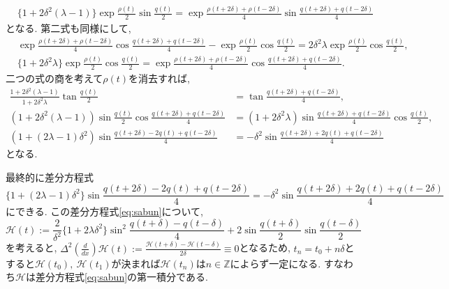 \documentclass[a4paper]{ujarticle}
\numberwithin{equation}{section}
\theoremstyle{definition}
\begin{document}
\begin{enumerate}
\begin{align}
            &\{1 + 2 \delta^2 (\lambda - 1) \} \exp \frac{\rho(t)}{2} \sin{\frac{q(t)}{2}} 
            = \exp \frac{\rho(t + 2 \delta) + \rho(t - 2 \delta)}{4} \sin{\frac{q(t + 2 \delta) + q(t - 2 \delta)}{4}}
        \end{align}
        となる.
        第二式も同様にして,
        \begin{align}
            &\exp \frac{\rho(t + 2 \delta) + \rho(t - 2 \delta)}{4} \cos{\frac{q(t + 2 \delta) + q(t - 2 \delta)}{4}} - \exp \frac{\rho(t)}{2} \cos{\frac{q(t)}{2}}
            = 2 \delta^2 \lambda \exp \frac{\rho(t)}{2} \cos{\frac{q(t)}{2}}, \\
            &\{1 + 2 \delta^2 \lambda \} \exp \frac{\rho(t)}{2} \cos{\frac{q(t)}{2}} 
            = \exp \frac{\rho(t + 2 \delta) + \rho(t - 2 \delta)}{4} \cos{\frac{q(t + 2 \delta) + q(t - 2 \delta)}{4}}.
        \end{align}
        二つの式の商を考えて$\rho(t)$を消去すれば,
        \begin{align}
            \frac{1 + 2 \delta^2 (\lambda - 1)}{1 + 2 \delta^2 \lambda} \tan{\frac{q(t)}{2}} 
            &= \tan{\frac{q(t + 2 \delta) + q(t - 2 \delta)}{4}}, \\
            (1 + 2 \delta^2 (\lambda - 1)) \sin{\frac{q(t)}{2}} \cos{\frac{q(t + 2 \delta) + q(t - 2 \delta)}{4}}
            &= (1 + 2 \delta^2 \lambda) \sin{\frac{q(t + 2 \delta) + q(t - 2 \delta)}{4}} \cos{\frac{q(t)}{2}}, \\
            (1 + (2 \lambda - 1) \delta^2) \sin{\frac{q(t + 2 \delta) - 2 q(t) + q(t - 2 \delta)}{4}}
            &= - \delta^2 \sin{\frac{q(t + 2 \delta) + 2 q(t) + q(t - 2 \delta)}{4}}
        \end{align}
        となる.
    \end{enumerate}
    
    最終的に差分方程式
    \begin{equation} \label{eq:sabun}
        \{1 + (2 \lambda - 1) \delta^2\} \sin{\frac{q(t + 2 \delta) - 2 q(t) + q(t - 2 \delta)}{4}} = - \delta^2 \sin{\frac{q(t + 2 \delta) + 2 q(t) + q(t - 2 \delta)}{4}}
    \end{equation}
    にできる. この差分方程式\eqref{eq:sabun}について,
    \begin{equation}
        \mathcal{H}(t) := \frac{2}{\delta^2} \{1 + 2 \lambda \delta^2\} \sin^2{\frac{q(t + \delta) - q(t - \delta)}{4}} + 2 \sin{\frac{q(t + \delta)}{2}} \sin{\frac{q(t - \delta)}{2}}
    \end{equation}
    を考えると, $\displaystyle \Delta^2(\frac{d}{d x}) \mathcal{H}(t) := \frac{\mathcal{H}(t + \delta) - \mathcal{H}(t - \delta)}{2 \delta} \equiv 0$となるため, 
    $t_n = t_0 + n \delta$とすると$\mathcal{H}(t_0), \ \mathcal{H}(t_1)$が決まれば$\mathcal{H}(t_n)$は$n \in \mathbb{Z}$によらず一定になる.
    すなわち$\mathcal{H}$は差分方程式\eqref{eq:sabun}の第一積分である.
\end{document}
